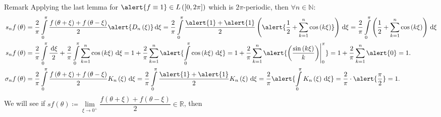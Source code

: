 \begin{frame}
	\frametitle{\secname}

	\begin{block}{Remark}
		Applying the last lemma for
		\begin{math}
			\alert{f\equiv 1}\in
			L\left(\left[0,2\pi\right]\right)
		\end{math}
		which is $2\pi$-periodic, then
		\begin{math}
			\forall n\in\mathds{N}
		\end{math}:
		\begin{align*}
			s_{n}f\left(\theta\right)      & =
			\frac{2}{\pi}
			\int\limits_{0}^{\pi}
			\frac{f\left(\theta+\xi\right)+f\left(\theta-\xi\right)}{2}
			\alert{D_{n}\left(\xi\right)}
			\dl\xi
			=
			\frac{2}{\pi}
			\int\limits_{0}^{\pi}
			\frac{\alert{1}+\alert{1}}{2}
			\left(
			\alert{\frac{1}{2}+\sum_{k=1}^{n}\cos\left(k\xi\right)}
			\right)
			\dl\xi
			=
			\frac{2}{\pi}
			\int\limits_{0}^{\pi}
			\left(
			\frac{1}{2}+\sum_{k=1}^{n}\cos\left(k\xi\right)
			\right)
			\dl\xi                             \\
			s_{n}f\left(\theta\right)      & =
			\frac{2}{\pi}
			\int\limits_{0}^{\pi}
			\frac{\dl\xi}{2}
			+
			\frac{2}{\pi}
			\int\limits_{0}^{\pi}
			\sum_{k=1}^{n}
			\cos\left(k\xi\right)
			\dl\xi
			=
			1+
			\frac{2}{\pi}
			\sum_{k=1}^{n}
			\alert{
				\int\limits_{0}^{\pi}
				\cos\left(k\xi\right)
				\dl\xi
			}
			=
			1+
			\frac{2}{\pi}
			\sum_{k=1}^{n}
			\alert{
				{
						\left(
						\frac{\sin\left(k\xi\right)}{k}
						\right)
						\Biggr|
					}_{0}^{\pi}
			}
			=
			1+
			\frac{2}{\pi}
			\sum_{k=1}^{n}
			\alert{0}=
			1.                                 \\
			\sigma_{n}f\left(\theta\right) & =
			\frac{2}{\pi}
			\int\limits_{0}^{\pi}
			\frac{f\left(\theta+\xi\right)+f\left(\theta-\xi\right)}{2}
			K_{n}\left(\xi\right)
			\dl\xi=
			\frac{2}{\pi}
			\int\limits_{0}^{\pi}
			\frac{\alert{1}+\alert{1}}{2}
			K_{n}\left(\xi\right)
			\dl\xi
			=
			\frac{2}{\pi}
			\alert{
				\int\limits_{0}^{\pi}
				K_{n}\left(\xi\right)
				\dl\xi
			}
			=
			\frac{2}{\pi}\cdot
			\alert{\frac{\pi}{2}}
			=
			1.
		\end{align*}
		We will see if
		\begin{math}
			sf\left(\theta\right)\coloneqq
			\lim\limits_{\xi\to0^{+}}
			\dfrac{
				f\left(\theta+\xi\right)+f\left(\theta-\xi\right)
			}{2}\in\mathds{R}
		\end{math},
		then
		\begin{math}

\end{math}
\end{block}
\end{frame}
